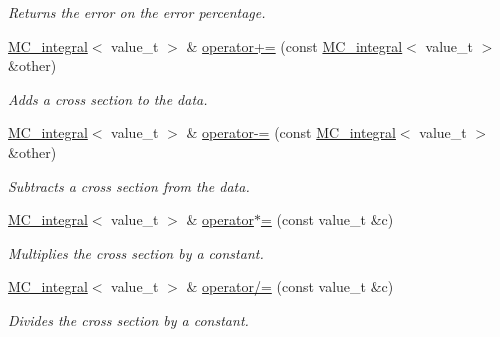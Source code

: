\begin{DoxyCompactItemize}
\begin{DoxyCompactList}\small\item\em Returns the error on the error percentage. \end{DoxyCompactList}\item 
\hypertarget{a00363_adbf522c34eefb8c3f778ace5f43f651d}{\hyperlink{a00363}{M\-C\-\_\-integral}$<$ value\-\_\-t $>$ \& \hyperlink{a00363_adbf522c34eefb8c3f778ace5f43f651d}{operator+=} (const \hyperlink{a00363}{M\-C\-\_\-integral}$<$ value\-\_\-t $>$ \&other)}\label{a00363_adbf522c34eefb8c3f778ace5f43f651d}

\begin{DoxyCompactList}\small\item\em Adds a cross section to the data. \end{DoxyCompactList}\item 
\hypertarget{a00363_aca3cdcca491ffd8942c387c2031ee75c}{\hyperlink{a00363}{M\-C\-\_\-integral}$<$ value\-\_\-t $>$ \& \hyperlink{a00363_aca3cdcca491ffd8942c387c2031ee75c}{operator-\/=} (const \hyperlink{a00363}{M\-C\-\_\-integral}$<$ value\-\_\-t $>$ \&other)}\label{a00363_aca3cdcca491ffd8942c387c2031ee75c}

\begin{DoxyCompactList}\small\item\em Subtracts a cross section from the data. \end{DoxyCompactList}\item 
\hypertarget{a00363_a5ae480f831de6aea00087f513dea9421}{\hyperlink{a00363}{M\-C\-\_\-integral}$<$ value\-\_\-t $>$ \& \hyperlink{a00363_a5ae480f831de6aea00087f513dea9421}{operator$\ast$=} (const value\-\_\-t \&c)}\label{a00363_a5ae480f831de6aea00087f513dea9421}

\begin{DoxyCompactList}\small\item\em Multiplies the cross section by a constant. \end{DoxyCompactList}\item 
\hypertarget{a00363_a8829847aa62867c5edd0cf769938c712}{\hyperlink{a00363}{M\-C\-\_\-integral}$<$ value\-\_\-t $>$ \& \hyperlink{a00363_a8829847aa62867c5edd0cf769938c712}{operator/=} (const value\-\_\-t \&c)}\label{a00363_a8829847aa62867c5edd0cf769938c712}

\begin{DoxyCompactList}\small\item\em Divides the cross section by a constant. \end{DoxyCompactList}\end{DoxyCompactItemize}
